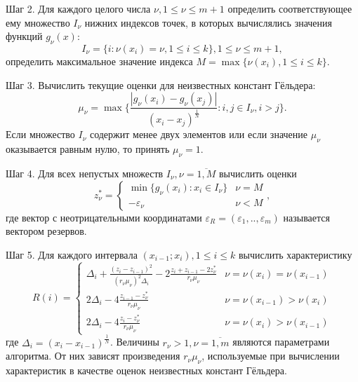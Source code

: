 \documentclass[11pt, oneside, a4paper]{article}
\begin{document}
Шаг 2. Для каждого целого числа \(\nu ,1\leqslant \nu \leqslant m+1\) определить соответствующее
ему множество \(I_{\nu }\) нижних индексов точек, в которых вычислялись значения
функций \(g_{\nu }(x)\):
\begin{displaymath}
  I_{\nu }=\{i:\nu (x_{i})=\nu ,1\leqslant i\leqslant k\},1\leq \nu \leqslant m+1,
\end{displaymath}
определить максимальное значение индекса \(M=\max\{\nu (x_{i}),1\leq i\leq k\}\).

Шаг 3. Вычислить текущие оценки для неизвестных констант Гёльдера:
\begin{equation}
  \label{step2}
  \mu _{\nu }=\max\{\frac{|g_{\nu }(x_{i})-g_{\nu }(x_{j})|}{(x_{i}-x_{j})^{\frac{1}{N}}}:i,j\in I_{\nu },i>j\}.
\end{equation}
Если множество \(I_{\nu }\) содержит менее двух элементов или если значение \(\mu _{\nu }\)
оказывается равным нулю, то принять \(\mu _{\nu }=1\).

Шаг 4. Для всех непустых множеств \(I_{\nu },\nu ={\overline {1,M}}\) вычислить оценки
\begin{displaymath}
  z_{\nu }^{*}={\begin{cases}\min\{g_{\nu }(x_{i}):x_{i}\in I_{\nu }\}&\nu =M\\-\varepsilon _{\nu }&\nu <M\end{cases}},
\end{displaymath}
где вектор с неотрицательными координатами \(\varepsilon _{R}=(\varepsilon _{1},..,\varepsilon _{m})\) называется вектором резервов.

Шаг 5. Для каждого интервала \((x_{i-1};x_{i}),1\leqslant i\leqslant k\) вычислить характеристику
\begin{equation}
  \label{step3_1}
  R(i)={\begin{cases}\Delta _{i}+{\frac {(z_{i}-z_{i-1})^{2}}{(r_{\nu }\mu _{\nu })^{2}\Delta _{i}}}-2{\frac {z_{i}+z_{i-1}-2z_{\nu }^{*}}{r_{\nu }\mu _{\nu }}}&\nu =\nu (x_{i})=\nu (x_{i-1})\\2\Delta _{i}-4{\frac {z_{i-1}-z_{\nu }^{*}}{r_{\nu }\mu _{\nu }}}&\nu =\nu (x_{i-1})>\nu (x_{i})\\2\Delta _{i}-4{\frac {z_{i}-z_{\nu }^{*}}{r_{\nu }\mu _{\nu }}}&\nu =\nu (x_{i})>\nu (x_{i-1})\end{cases}}
\end{equation}
где \(\Delta _{i}=(x_{i}-x_{i-1})^{\frac{1}{N}}\). Величины \(r_{\nu }>1,\nu ={\overline {1,m}}\)
являются параметрами алгоритма. От них зависят произведения \(r_{\nu }\mu _{\nu }\),
используемые при вычислении характеристик в качестве оценок неизвестных констант Гёльдера.
\end{document}
